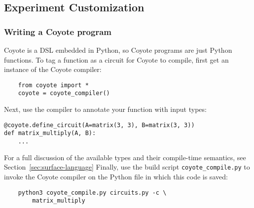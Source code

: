 \subsection{Experiment Customization}
\subsubsection{Writing a Coyote program}
Coyote is a DSL embedded in Python, so Coyote programs are just Python functions. To tag a function as a circuit for Coyote to compile, first get an instance of the Coyote compiler:
\begin{verbatim}
    from coyote import *
    coyote = coyote_compiler()
\end{verbatim}
Next, use the compiler to annotate your function with input types:
\begin{verbatim}
@coyote.define_circuit(A=matrix(3, 3), B=matrix(3, 3))
def matrix_multiply(A, B):
    ...
\end{verbatim}
For a full discussion of the available types and their compile-time semantics, see Section~\ref{sec:surface-language}
Finally, use the build script {\tt coyote\_compile.py} to invoke the Coyote compiler on the Python file in which this code is saved:
\begin{verbatim}
    python3 coyote_compile.py circuits.py -c \
        matrix_multiply
\end{verbatim}
